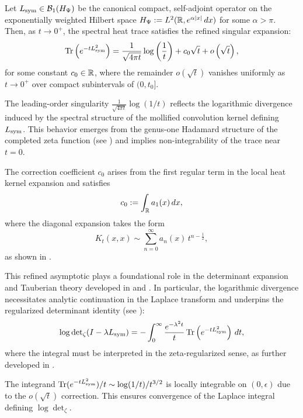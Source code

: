 \begin{proposition}
\label{prop:short_time_heat_expansion}
Let \( L_{\mathrm{sym}} \in \mathcal{B}_1(H_{\Psi}) \) be the canonical compact, self-adjoint operator on the exponentially weighted Hilbert space \( H_{\Psi} := L^2(\mathbb{R}, e^{\alpha |x|} \, dx) \) for some \( \alpha > \pi \). Then, as \( t \to 0^+ \), the spectral heat trace satisfies the refined singular expansion:
\[
\operatorname{Tr}\left(e^{-t L_{\mathrm{sym}}^2}\right)
= \frac{1}{\sqrt{4\pi t}} \log\left( \frac{1}{t} \right)
+ c_0 \sqrt{t} + o\left( \sqrt{t} \right),
\]
for some constant \( c_0 \in \mathbb{R} \), where the remainder \( o(\sqrt{t}) \) vanishes uniformly as \( t \to 0^+ \) over compact subintervals of \( (0, t_0] \).

\medskip
\noindent
The leading-order singularity \( \frac{1}{\sqrt{4\pi t}} \log(1/t) \) reflects the logarithmic divergence induced by the spectral structure of the mollified convolution kernel defining \( L_{\mathrm{sym}} \). This behavior emerges from the genus-one Hadamard structure of the completed zeta function (see ) and implies non-integrability of the trace near \( t = 0 \).

\medskip
\noindent
The correction coefficient \( c_0 \) arises from the first regular term in the local heat kernel expansion and satisfies
\[
c_0 := \int_{\mathbb{R}} a_1(x) \, dx,
\]
where the diagonal expansion takes the form
\[
K_t(x,x) \sim \sum_{n=0}^{\infty} a_n(x)\, t^{n - \frac{1}{2}},
\]
as shown in .

\medskip
\noindent
This refined asymptotic plays a foundational role in the determinant expansion and Tauberian theory developed in  and . In particular, the logarithmic divergence necessitates analytic continuation in the Laplace transform and underpins the regularized determinant identity (see ):
\[
\log \det\nolimits_{\zeta}(I - \lambda L_{\mathrm{sym}}) = - \int_0^\infty \frac{e^{-\lambda^2 t}}{t} \operatorname{Tr}\left(e^{-t L_{\mathrm{sym}}^2} \right) \, dt,
\]
where the integral must be interpreted in the zeta-regularized sense, as further developed in .
\end{proposition}

\begin{remark}
The integrand \( \operatorname{Tr}(e^{-tL_{\mathrm{sym}}^2}) / t \sim \log(1/t)/t^{3/2} \) is locally integrable on \( (0,\epsilon) \) due to the \( o(\sqrt{t}) \) correction. This ensures convergence of the Laplace integral defining \( \log \det_\zeta \).
\end{remark}
